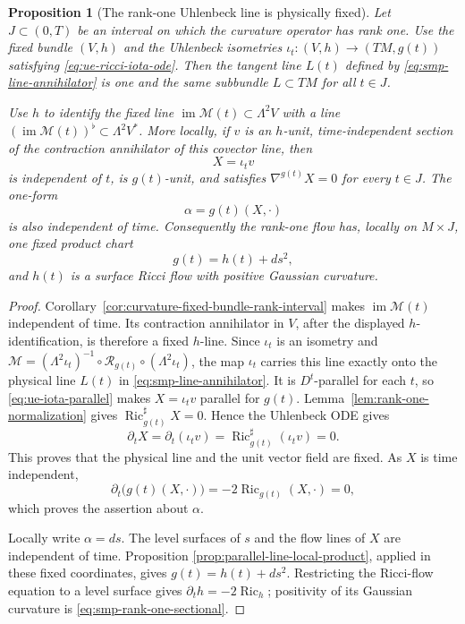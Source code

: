 \documentclass[10pt]{coll-l}
\newtheorem{proposition}[theorem]{Proposition}
\theoremstyle{definition}
\theoremstyle{remark}
\numberwithin{section}{chapter}
\numberwithin{equation}{chapter}
\newcommand{\Ric}{\operatorname{Ric}}
\begin{document}
\begin{proposition}[The rank-one Uhlenbeck line is physically fixed]
\label{prop:rank-one-uhlenbeck-line-fixed}
Let $J\subset(0,T)$ be an interval on which the curvature operator has rank
one.  Use the fixed bundle $(V,h)$ and the Uhlenbeck isometries
$\iota_t\colon(V,h)\to(TM,g(t))$ satisfying
\eqref{eq:ue-ricci-iota-ode}.  Then the tangent line $L(t)$ defined by
\eqref{eq:smp-line-annihilator} is one and the same subbundle
$L\subset TM$ for all $t\in J$.

Use $h$ to identify the fixed line
$\operatorname{im}\mathcal M(t)\subset\Lambda^2V$ with a line
$(\operatorname{im}\mathcal M(t))^\flat\subset\Lambda^2V^*$.  More
locally, if $v$ is an $h$-unit, time-independent section of the contraction
annihilator of this covector line, then
\begin{equation}
                         X=\iota_tv                    \label{eq:smp-fixed-physical-line-field}
\end{equation}
is independent of $t$, is $g(t)$-unit, and satisfies
$\nabla^{g(t)}X=0$ for every $t\in J$.  The one-form
\begin{equation}
                         \alpha=g(t)(X,\cdot)            \label{eq:smp-fixed-physical-line-form}
\end{equation}
is also independent of time.  Consequently the rank-one flow has, locally
on $M\times J$, one fixed product chart
\[
                           g(t)=h(t)+ds^2,
\]
and $h(t)$ is a surface Ricci flow with positive Gaussian curvature.
\end{proposition}

\begin{proof}
Corollary~\ref{cor:curvature-fixed-bundle-rank-interval} makes
$\operatorname{im}\mathcal M(t)$ independent of time.  Its contraction
annihilator in $V$, after the displayed $h$-identification, is therefore a
fixed $h$-line.  Since $\iota_t$ is an isometry and
$\mathcal M=(\Lambda^2\iota_t)^{-1}\circ\mathcal R_{g(t)}
\circ(\Lambda^2\iota_t)$, the map $\iota_t$ carries this line exactly onto the
physical line $L(t)$ in \eqref{eq:smp-line-annihilator}.  It is
$D^t$-parallel for
each $t$, so \eqref{eq:ue-iota-parallel} makes $X=\iota_tv$ parallel for
$g(t)$.  Lemma~\ref{lem:rank-one-normalization} gives
$\Ric^\sharp_{g(t)}X=0$.  Hence the Uhlenbeck ODE gives
\[
       \partial_tX
        =\partial_t(\iota_tv)
        =\Ric^\sharp_{g(t)}(\iota_tv)=0.
\]
This proves that the physical line and the unit vector field are fixed.  As
$X$ is time independent,
\[
 \partial_t\bigl(g(t)(X,\cdot)\bigr)
       =-2\Ric_{g(t)}(X,\cdot)=0,
\]
which proves the assertion about $\alpha$.

Locally write $\alpha=ds$.  The level surfaces of $s$ and the flow lines of
$X$ are independent of time.  Proposition
\ref{prop:parallel-line-local-product}, applied in these fixed coordinates,
gives $g(t)=h(t)+ds^2$.  Restricting the Ricci-flow equation to a level
surface gives $\partial_th=-2\Ric_h$; positivity of its Gaussian curvature
is \eqref{eq:smp-rank-one-sectional}.
\end{proof}
\end{document}
